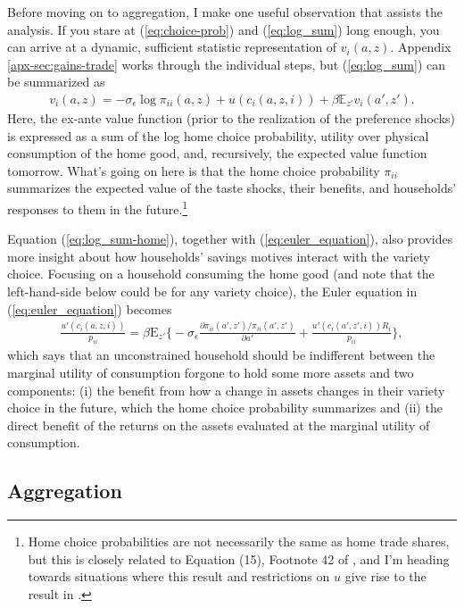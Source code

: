 \documentclass[12pt,pdftex]{article}
\begin{document}
\begin{onehalfspacing}
Before moving on to aggregation, I make one useful observation that assists the analysis. If you stare at (\ref{eq:choice-prob}) and (\ref{eq:log_sum}) long enough, you can arrive at a dynamic, sufficient statistic representation of $v_i(a, z)$. Appendix \ref{apx-sec:gains-trade} works through the individual steps, but (\ref{eq:log_sum}) can be summarized as
\begin{align}
v_i(a, z) = -\sigma_{\epsilon} \log \pi_{ii}(a,z) + u(c_{i}(a,z,i)) + \beta \mathbb{E}_{z'} v_{i}(a',z').
\label{eq:log_sum-home}
\end{align}
Here, the ex-ante value function (prior to the realization of the preference shocks) is expressed as a sum of the log home choice probability, utility over physical consumption of the home good, and, recursively, the expected value function tomorrow. What's going on here is that the home choice probability $\pi_{ii}$ summarizes the expected value of the taste shocks, their benefits, and households' responses to them in the future.\footnote{Home choice probabilities are not necessarily the same as home trade shares, but this is closely related to Equation (15), Footnote 42 of \citet{eaton2002technology}, and I'm heading towards situations where this result and restrictions on $u$ give rise to the result in \citet{arkolakis2012new}.}

Equation (\ref{eq:log_sum-home}), together with (\ref{eq:euler_equation}), also provides more insight about how households' savings motives interact with the variety choice. Focusing on a household consuming the home good (and note that the left-hand-side below could be for any variety choice), the Euler equation in (\ref{eq:euler_equation}) becomes
\begin{align}
\frac{u'(c_{i}(a,z,i))}{p_{ii}} = \beta \mathrm{E}_{z'} \bigg \{ -\sigma_{\epsilon} \frac{\partial \pi_{ii}(a',z') / \pi_{ii}(a',z')}{\partial a'} + \frac{u'(c_{i}(a',z',i))R_i}{p_{ii}} \bigg \},
\label{eq:euler_equation-home}
\end{align}
which says that an unconstrained household should be indifferent between the marginal utility of consumption forgone to hold some more assets and two components: (i) the benefit from how a change in assets changes in their variety choice in the future, which the home choice probability summarizes and (ii) the direct benefit of the returns on the assets evaluated at the marginal utility of consumption.

\subsection{Aggregation}


\end{onehalfspacing}
\end{document}
